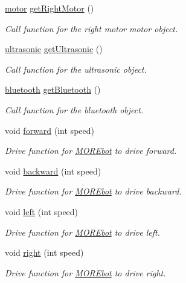 \begin{DoxyCompactItemize}
\mbox{\hyperlink{classmotor}{motor}} \mbox{\hyperlink{class_m_o_r_ebot_a07d97e38e8d0f40696b4d7d64078d5af}{get\+Right\+Motor}} ()
\begin{DoxyCompactList}\small\item\em Call function for the right motor motor object. \end{DoxyCompactList}\item 
\mbox{\hyperlink{classultrasonic}{ultrasonic}} \mbox{\hyperlink{class_m_o_r_ebot_a30c116ce328f2ee883edf580362a6e8a}{get\+Ultrasonic}} ()
\begin{DoxyCompactList}\small\item\em Call function for the ultrasonic object. \end{DoxyCompactList}\item 
\mbox{\hyperlink{classbluetooth}{bluetooth}} \mbox{\hyperlink{class_m_o_r_ebot_a339a4d8f12504ab13e419f38ab04c864}{get\+Bluetooth}} ()
\begin{DoxyCompactList}\small\item\em Call function for the bluetooth object. \end{DoxyCompactList}\item 
void \mbox{\hyperlink{class_m_o_r_ebot_ac5646dd5b3bb754375f4516520d3774a}{forward}} (int speed)
\begin{DoxyCompactList}\small\item\em Drive function for \mbox{\hyperlink{class_m_o_r_ebot}{M\+O\+R\+Ebot}} to drive forward. \end{DoxyCompactList}\item 
void \mbox{\hyperlink{class_m_o_r_ebot_ac8ae09d56affec3726ecba914a105ab2}{backward}} (int speed)
\begin{DoxyCompactList}\small\item\em Drive function for \mbox{\hyperlink{class_m_o_r_ebot}{M\+O\+R\+Ebot}} to drive backward. \end{DoxyCompactList}\item 
void \mbox{\hyperlink{class_m_o_r_ebot_ae1b5d9ec8043062fdfe9c9fd49dbeeba}{left}} (int speed)
\begin{DoxyCompactList}\small\item\em Drive function for \mbox{\hyperlink{class_m_o_r_ebot}{M\+O\+R\+Ebot}} to drive left. \end{DoxyCompactList}\item 
void \mbox{\hyperlink{class_m_o_r_ebot_a2e6c104080d6213165668db05122ecbf}{right}} (int speed)
\begin{DoxyCompactList}\small\item\em Drive function for \mbox{\hyperlink{class_m_o_r_ebot}{M\+O\+R\+Ebot}} to drive right. \end{DoxyCompactList}\item 

\end{DoxyCompactItemize}
